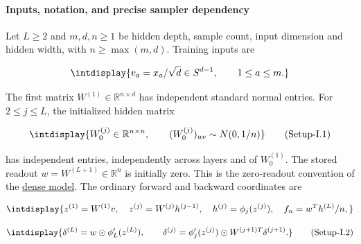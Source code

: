\paragraph{Inputs, notation, and precise sampler dependency}
\label{int:setup-implicit-1}
\mbox{}\par\smallskip


Let \(L\ge2\) and \(m,\allowbreak d,\allowbreak n\ge1\) be hidden depth, sample count, input dimension and hidden width, with \(n\ge\max(m,\allowbreak d)\). Training inputs are


\begingroup\renewcommand{\theHequation}{intdisplay.1078}
\begin{equation*}
\intdisplay{
v_a=x_a/\sqrt d\in S^{d-1},\qquad 1\le a\le m.
}
\end{equation*}
\endgroup


The first matrix \(W^{(1)}\in\mathbb R^{n\times d}\) has independent standard normal entries. For \(2\le j\le L\), the initialized hidden matrix


\label{int:eq-setup-i-1}
\begingroup\renewcommand{\theHequation}{intdisplay.1079}
\begin{equation}
\intdisplay{
W_0^{(j)}\in\mathbb R^{n\times n},\qquad
(W_0^{(j)})_{uv}\sim N(0,1/n)
}
\tag{Setup-I.1}
\label{int:eq-0569-setup-i-1}
\end{equation}
\endgroup


has independent entries, independently across layers and of \(W_0^{(1)}\). The stored readout \(w=W^{(L+1)}\in\mathbb R^n\) is initially zero. This is the zero-readout convention of the \hyperref[int:dense-model-and-certificates]{dense model}. The ordinary forward and backward coordinates are


\begingroup\renewcommand{\theHequation}{intdisplay.1080}
\begin{equation*}
\intdisplay{
z^{(1)}=W^{(1)}v,\quad
z^{(j)}=W^{(j)}h^{(j-1)},\quad
h^{(j)}=\phi_j(z^{(j)}),\quad f_n=w^Th^{(L)}/n,
}
\end{equation*}
\endgroup

\label{int:eq-setup-i-2}
\begingroup\renewcommand{\theHequation}{intdisplay.1081}
\begin{equation}
\intdisplay{
\delta^{(L)}=w\odot\phi_L'(z^{(L)}),\qquad
\delta^{(j)}=\phi_j'(z^{(j)})\odot W^{(j+1)T}\delta^{(j+1)}.
}
\tag{Setup-I.2}
\label{int:eq-0570-setup-i-2}
\end{equation}
\endgroup

